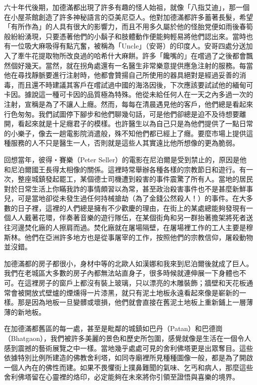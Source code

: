 六十年代後期，加德滿都出現了許多有趣的怪人始祖，就像「八指艾迪」，那一個在小屋茶館創造了許多神秘語言的亞美尼亞人。他對加德滿都許多蓄著長髮，希望「有所作為」的人具有很大的影響力，而且不用多久屬於他的怪胎党便如雨後春筍般紛紛湧現，只要憑著他們的小鬍子和肢體動作便能夠輕易將他們認出來。當時也有一位吸大麻吸得有點亢奮，被稱為「Uncle」（安哥）的印度人。安哥四處分送加入了牽牛花提取物所改良過的哈希什大麻餅。許多「饞嘴的」在嚐過了之後都會飄然個好幾天。當然，就在拐角處還有一名醫生非常樂意提供應急注射的服務。每當他在尋找靜脈要進行注射時，他都會贊揚自己所使用的器具絕對是經過妥善的消毒，而且還不時建議其客戶在嚐試過中國的海洛因後，下次應該要試試他的緬甸可卡因。據說這一種可卡因的品質極為特殊。他從未給任何人在一天之內多過一次的注射，宣稱是為了不讓人上癮。然而，每每在清晨遇見他的客戶，他們總是看起來行色匆匆。我們試圖停下腳步和他們聊幾句話，可是他們卻總是迫不及待想要離開，看起來就是十足癮君子的模樣。也許醫生以為自己只是為他們提供了一點日常的小樂子，像去一趟電影院消遣般，殊不知他們都已經上了癮。要麼市場上提供這種服務的人不只是醫生一人，否則就是這些人其實遠比他所想像的更為脆弱。

回想當年，彼得‧賽樂（Peter
Seller）的電影在尼泊爾是受到禁止的，原因是他和尼泊爾國王長得太相像的關係。這裡時常舉辦各種各樣的宗教節日和遊行。有一次，整座城鎮發起罷工，某個德士司機遭到殺害的事件震驚了所有人。當地的居民對於日常生活上你瞞我詐的事情頗習以為常，甚至政治殺害事件也不是甚麼新鮮事兒，可是當地卻從未發生過任何持械搶劫（為了金錢公然殺人！）的事件。在大多數的日子裡，這裡的人們總是擁有不少歡慶的理由，在街上的某處總能夠發現有一個人人戴著花環，伴奏著音樂的遊行隊伍，在某個街角和另一群抬著擔架將死者送往河邊焚化廠的人擦肩而過。焚化廠就在屠場隔壁，在屠場裡工作的工人主要是穆斯林。他們在亞洲許多地方也是從事屠宰的工作，按照他們的宗教信仰，屠殺動物並沒錯。

加德滿都的房子都很小，身材中等的北歐人如漢娜和我來到尼泊爾後就成了巨人。我們在老城區大多數的房子內都無法站直身子，很多時候就連伸展一下身體也不可。在這裡房子的窗戶上都沒有裝上玻璃，只以漂亮的木雕裝飾；牆壁和天花板通常會被開放式壁爐的煙燻得一片漆黑，就只有泥土地板永遠看起來像是嶄新的一樣。那是因為地板一旦變髒或壞損，他們就會直接在舊泥土地板上重新鋪上一層薄薄的新地板。

在加德滿都舊區的每一處，甚至是毗鄰的城鎮如巴丹（Patan）和巴德崗（Bhatgaon），我們被許多美麗的景色和歷史所包圍，感覺就像是生活在一個令人感到震撼的藝術展覽之中一樣。當地幾乎處處可見的舍利佛塔更是出眾奪目。這些依據特別比例所建造的佛教舍利塔，如同寺廟裡所見種種圖像一般，都是為了開啟一個人內在的佛性而建。如果不畏懼街上撲鼻難聞的氣味、乞丐和病人，那麼這些舍利佛塔留在心靈裡的烙印，必定能夠在未來將你引領至證悟與喜樂的境界。

